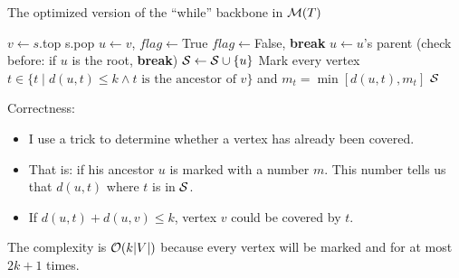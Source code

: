 \documentclass{article}
\begin{document}
\begin{algorithm}[H]
	\caption{The optimized version of the ``while'' backbone in $\mathcal{M}(T)$}
	\label{ckp}
	\begin{algorithmic}[1]
		\renewcommand{\algorithmicrequire}{\textbf{Input:}}
		\renewcommand{\algorithmicensure}{\textbf{Output:}}
		\renewcommand{\algorithmiccomment}[1]{\hfill\textit{\textcolor{blue}{\##1}}}
		\STATE $v\gets s$.top
		\STATE s.pop
		\STATE $u\gets v$, $flag\gets$True
		\STATE $flag\gets$False, \textbf{break}
		\ENDIF
		\STATE $u\gets u$'s parent (check before: if $u$ is the root, \textbf{break})
		\ENDWHILE
		\STATE $\mathcal{S}\gets\mathcal{S}\cup\{u\}$
		\STATE Mark every vertex $t\in\{t\mid d(u,t)\le k\land t \text{ is the ancestor of $v$}\}$ and $m_t=\min[d(u,t),m_t]$
		\STATE
		\ENDIF
		\ENDWHILE
		\RETURN $\mathcal{S}$
	\end{algorithmic} 
\end{algorithm}
Correctness: 
\begin{itemize}
		\item I use a trick to determine whether a vertex has already been covered.
		\item That is: if his ancestor $u$ is marked with a number $m$. This number tells us that $d(u,t)$ where $t$ is in  $\mathcal{S}$.
		\item If $d(u,t)+d(u,v)\le k$, vertex $v$ could be covered by $t$.
\end{itemize}
The complexity is $\mathcal{O}(k\qty|V|)$ because every vertex will be marked and  for at most  $2k+1$ times.
\end{document}

